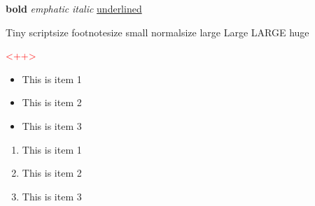 {\textbf{bold}}
{\emph{emphatic}}
{\textit{italic}}
{\underline{underlined}}%

{\tiny{Tiny}}
{\scriptsize{scriptsize}}
{\footnotesize{footnotesize}}
{\small{small}}
{\normalsize{normalsize}}
{\large{large}}
{\Large{Large}}
{\LARGE{LARGE}}
{\huge{huge}}%

\textcolor{red}{<++>}%

\noindent{\dotfill}
\noindent{\hrulefill}%

\smallskip
\medskip
\bigskip%

\begin{itemize}
	\item This is item 1
	\item This is item 2
	\item This is item 3
\end{itemize}
\begin{enumerate}
	\item This is item 1
	\item This is item 2
	\item This is item 3
\end{enumerate}%
